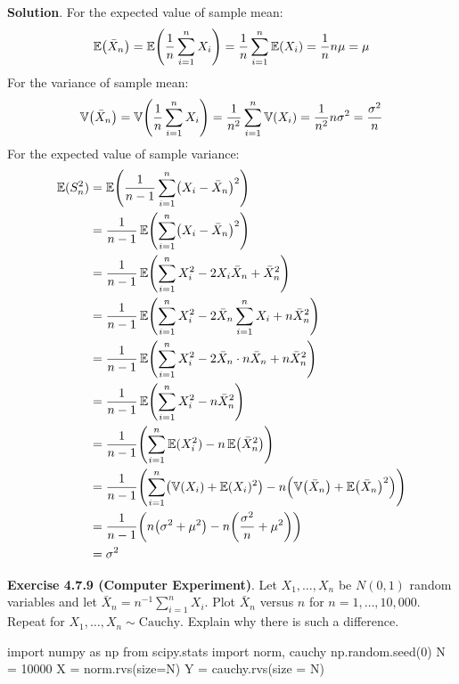 \textbf{Solution}.
For the expected value of sample mean:
\[
\EXP\left(\bar{X}_{n}\right) 
= \EXP\left( \frac{1}{n} \sum_{i=1}^{n} X_{i} \right)
= \frac{1}{n} \sum_{i=1}^{n} \EXP(X_{i})
= \frac{1}{n} n\mu = \mu
\]
For the variance of sample mean:
\[
\VAR\left(\bar{X}_{n}\right) 
= \VAR\left( \frac{1}{n} \sum_{i=1}^{n} X_{i} \right)
= \frac{1}{n^{2}} \sum_{i=1}^{n} \VAR(X_{i})
= \frac{1}{n^{2}} n \sigma^{2} = \frac{\sigma^{2}}{n}
\]
For the expected value of sample variance:
\begin{align*}
\EXP(S_{n}^{2}) &= \EXP\left(\frac{1}{n - 1} \sum_{i=1}^{n} \left(X_{i} - \bar{X}_{n}\right)^{2} \right) \\
&= \frac{1}{n - 1} \EXP \left( \sum_{i=1}^{n} \left(X_{i} - \bar{X}_{n}\right)^{2} \right) \\
&= \frac{1}{n - 1} \EXP \left( \sum_{i=1}^{n} X_{i}^{2} - 2 X_{i} \bar{X}_{n} + \bar{X}_{n}^{2} \right) \\
&= \frac{1}{n - 1} \EXP \left( \sum_{i=1}^{n} X_{i}^{2} - 2 \bar{X}_{n} \sum_{i=1}^{n} X_{i} + n \bar{X}_{n}^{2} \right) \\
&= \frac{1}{n - 1} \EXP \left( \sum_{i=1}^{n} X_{i}^{2} - 2 \bar{X}_{n} \cdot n \bar{X}_{n}  + n \bar{X}_{n}^{2} \right) \\
&= \frac{1}{n - 1} \EXP \left( \sum_{i=1}^{n} X_{i}^{2} - n \bar{X}_{n}^{2} \right) \\
&= \frac{1}{n - 1} \left( \sum_{i=1}^{n}  \EXP(X_{i}^{2}) - n \EXP\left( \bar{X}_{n}^{2} \right) \right) \\
&= \frac{1}{n - 1} \left( \sum_{i=1}^{n} \left(\VAR(X_{i}) + \EXP(X_{i})^{2} \right) - n \left(\VAR\left( \bar{X}_{n} \right) + \EXP\left(\bar{X}_{n}\right)^{2} \right)\right) \\
&= \frac{1}{n -1} \left( n \left( \sigma^{2} + \mu^{2}\right) - n \left(\frac{\sigma^{2}}{n} + \mu^{2} \right) \right) \\
&= \sigma^{2}
\end{align*}

\textbf{Exercise 4.7.9 (Computer Experiment)}. Let \(X_{1}, \dots, X_{n}\)
be \(N(0, 1)\) random variables and let
\(\bar{X}_{n} = n^{-1} \sum_{i=1}^{n} X_{i}\). Plot \(\bar{X}_{n}\)
versus \(n\) for \(n = 1, \dots, 10,000\). Repeat for
\(X_{1}, \dots, X_{n} \sim \text{Cauchy}\). Explain why there is such a
difference.

\begin{python}
import numpy as np
from scipy.stats import norm, cauchy
np.random.seed(0)
N = 10000
X = norm.rvs(size=N)
Y = cauchy.rvs(size = N)
\end{python}

